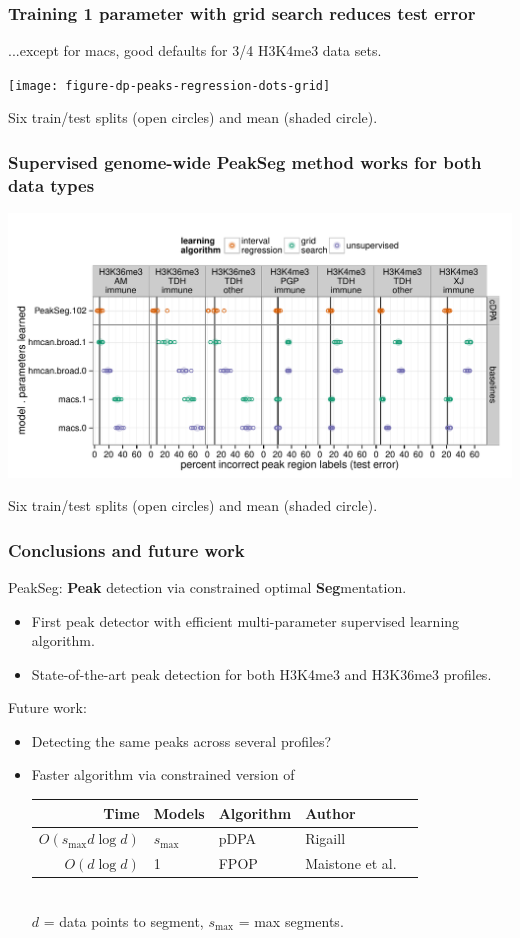 \documentclass{beamer}
\begin{document}
\begin{frame}
  \frametitle{Training 1 parameter with grid search reduces test error}

  ...except for macs, good defaults for 3/4 H3K4me3 data sets.

  \texttt{[image: figure-dp-peaks-regression-dots-grid]}

  Six train/test splits (open circles) and mean (shaded circle).
\end{frame}

\begin{frame}
  \frametitle{Supervised genome-wide PeakSeg method works for both
    data types}

  \includegraphics[width=\textwidth]{figure-dp-peaks-regression-dots}

  Six train/test splits (open circles) and mean (shaded circle).
\end{frame}

\begin{frame}
  \frametitle{Conclusions and future work}
  PeakSeg: \textbf{Peak} detection via constrained optimal
  \textbf{Seg}mentation.
  \begin{itemize}
  \item First peak detector with efficient multi-parameter supervised
    learning algorithm.
  \item State-of-the-art peak detection for both H3K4me3 and H3K36me3
    profiles.
  \end{itemize}
  Future work:
  \begin{itemize}
  \item Detecting the same peaks across several profiles?
  \item Faster algorithm via constrained version of
    \begin{tabular}{rllll}
      Time & Models & Algorithm & Author 
      \\
      \hline
      $O( s_{\text{max}} d\log d)$ & $s_{\text{max}}$ &
      pDPA & Rigaill 
      \\
      $O(d\log d)$ & 1 & FPOP & Maistone et al. %
    \end{tabular}
    \\
    $d$ = data points to segment, $s_{\text{max}}$ = max segments.
  \end{itemize}
\end{frame}
\end{document}
